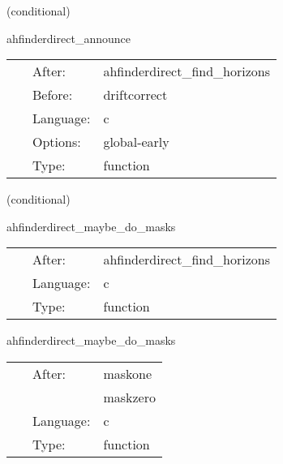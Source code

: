    (conditional) 

\hspace{5mm} ahfinderdirect\_announce 

\hspace{5mm}{\it announce horizon position(s) to other thorns } 


\hspace{5mm}

 \begin{tabular*}{160mm}{cll} 
~ & After:  & ahfinderdirect\_find\_horizons \\ 
~ & Before:  & driftcorrect \\ 
~ & Language:  & c \\ 
~ & Options:  & global-early \\ 
~ & Type:  & function \\ 
\end{tabular*} 


\vspace{5mm}

   (conditional) 

\hspace{5mm} ahfinderdirect\_maybe\_do\_masks 

\hspace{5mm}{\it set mask(s) based on apparent horizon position(s) } 


\hspace{5mm}

 \begin{tabular*}{160mm}{cll} 
~ & After:  & ahfinderdirect\_find\_horizons \\ 
~ & Language:  & c \\ 
~ & Type:  & function \\ 
\end{tabular*} 


\vspace{5mm}


\hspace{5mm} ahfinderdirect\_maybe\_do\_masks 

\hspace{5mm}{\it set mask(s) based on apparent horizon position(s) } 


\hspace{5mm}

 \begin{tabular*}{160mm}{cll} 
~ & After:  & maskone \\ 
~& ~ &maskzero\\ 
~ & Language:  & c \\ 
~ & Type:  & function \\ 
\end{tabular*} 


